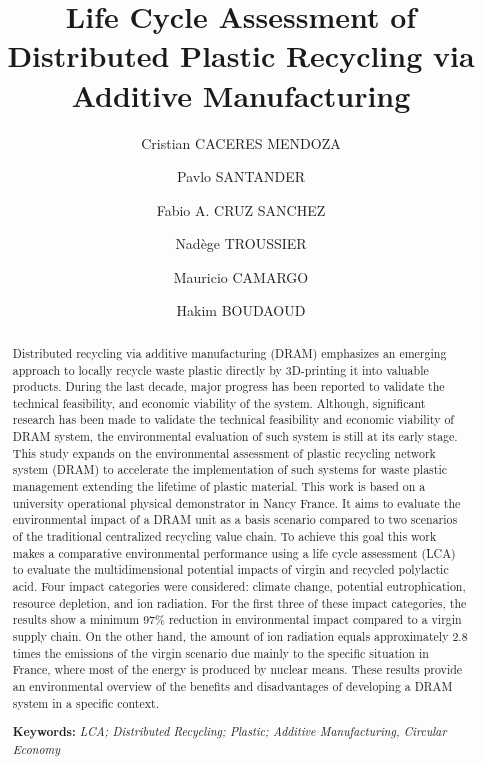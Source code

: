 \documentclass[12pt]{elsarticle} %
\begin{document}
\begin{frontmatter}

  \title{Life Cycle Assessment of Distributed Plastic Recycling via Additive Manufacturing}
    \author[UL]{Cristian CACERES MENDOZA%
  }
    \author[USACH]{Pavlo SANTANDER%
  }
  
    \author[UL]{Fabio A. CRUZ SANCHEZ%
  }
  
    \author[CREIDD]{Nadège TROUSSIER%
  }
  
    \author[UL]{Mauricio CAMARGO%
  }
  
    \author[UL]{Hakim BOUDAOUD%
  }
  
  
  \begin{abstract}
  Distributed recycling via additive manufacturing (DRAM) emphasizes an emerging approach to locally recycle waste plastic directly by 3D-printing it into valuable products. During the last decade, major progress has been reported to validate the technical feasibility, and economic viability of the system. Although, significant research has been made to validate the technical feasibility and economic viability of DRAM system, the environmental evaluation of such system is still at its early stage. This study expands on the environmental assessment of plastic recycling network system (DRAM) to accelerate the implementation of such systems for waste plastic management extending the lifetime of plastic material. This work is based on a university operational physical demonstrator in Nancy France. It aims to evaluate the environmental impact of a DRAM unit as a basis scenario compared to two scenarios of the traditional centralized recycling value chain. To achieve this goal this work makes a comparative environmental performance using a life cycle assessment (LCA) to evaluate the multidimensional potential impacts of virgin and recycled polylactic acid. Four impact categories were considered: climate change, potential eutrophication, resource depletion, and ion radiation. For the first three of these impact categories, the results show a minimum 97\% reduction in environmental impact compared to a virgin supply chain. On the other hand, the amount of ion radiation equals approximately 2.8 times the emissions of the virgin scenario due mainly to the specific situation in France, where most of the energy is produced by nuclear means. These results provide an environmental overview of the benefits and disadvantages of developing a DRAM system in a specific context.

  \textbf{Keywords:} \emph{LCA; Distributed Recycling; Plastic; Additive Manufacturing, Circular Economy}
  \end{abstract}
  
 \end{frontmatter}
\end{document}
